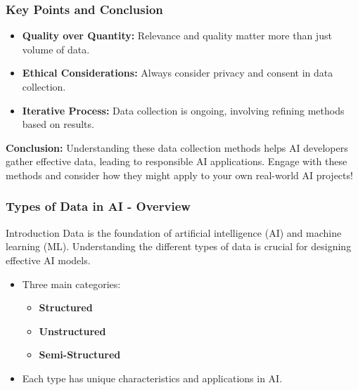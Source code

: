 \documentclass[aspectratio=169]{beamer}
\begin{document}
\begin{frame}[fragile]
    \frametitle{Key Points and Conclusion}
    \begin{itemize}
        \item \textbf{Quality over Quantity:} Relevance and quality matter more than just volume of data.
        \item \textbf{Ethical Considerations:} Always consider privacy and consent in data collection.
        \item \textbf{Iterative Process:} Data collection is ongoing, involving refining methods based on results.
    \end{itemize}
    
    \textbf{Conclusion:} Understanding these data collection methods helps AI developers gather effective data, leading to responsible AI applications. Engage with these methods and consider how they might apply to your own real-world AI projects!
\end{frame}

\begin{frame}[fragile]
    \frametitle{Types of Data in AI - Overview}
    \begin{block}{Introduction}
        Data is the foundation of artificial intelligence (AI) and machine learning (ML). Understanding the different types of data is crucial for designing effective AI models.
    \end{block}
    \begin{itemize}
        \item Three main categories: 
        \begin{itemize}
            \item \textbf{Structured}
            \item \textbf{Unstructured}
            \item \textbf{Semi-Structured}
        \end{itemize}
        \item Each type has unique characteristics and applications in AI.
    \end{itemize}
\end{frame}
\end{document}
